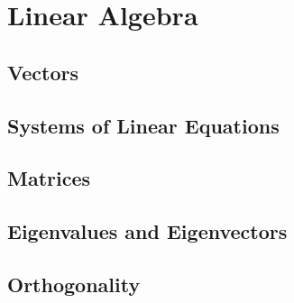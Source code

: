\tableofcontents
\newpage

\pagestyle{plain}


\part{Linear Algebra}
  \chapter{Vectors}
    
    
    
    

  \chapter{Systems of Linear Equations}
    
    
    
    
    

  \chapter{Matrices}
    
    
    
    
    
    
    

  \chapter{Eigenvalues and Eigenvectors}
    
    
    
    
    
    

  \chapter{Orthogonality}
    
    
    
    
    

